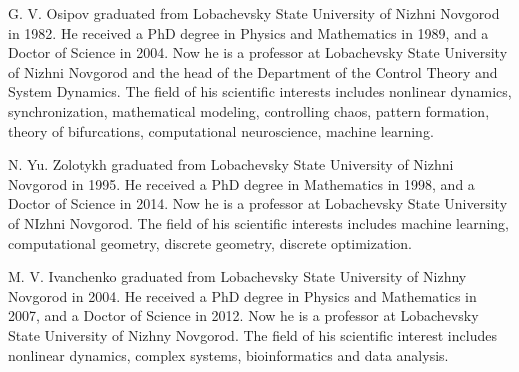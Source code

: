 \documentclass[submitted]{ieeeaccess}
\begin{document}
\begin{IEEEbiography}{G. V. Osipov} graduated from Lobachevsky State University of Nizhni Novgorod in 1982. He received a PhD degree in Physics and Mathematics in 1989, and a Doctor of Science in 2004. Now he is a professor at Lobachevsky State University of Nizhni Novgorod and the head of the Department of the Control Theory and System Dynamics. The field of his scientific interests includes nonlinear dynamics, synchronization, mathematical modeling,	controlling chaos, pattern formation, theory of bifurcations, computational neuroscience, machine learning.  
\end{IEEEbiography}


\begin{IEEEbiography}{N. Yu. Zolotykh} graduated from Lobachevsky State University of Nizhni Novgorod in 1995. He received a PhD degree in Mathematics in 1998, and a Doctor of Science in 2014. Now he is a professor at Lobachevsky State University of NIzhni Novgorod. The field of his scientific interests includes machine learning, computational geometry, discrete geometry, discrete optimization.  
\end{IEEEbiography}


\begin{IEEEbiography}{M. V. Ivanchenko} graduated from Lobachevsky State University of Nizhny Novgorod in 2004. He received a PhD degree in Physics and Mathematics in 2007, and a Doctor of Science in 2012. Now he is a professor at Lobachevsky State University of Nizhny Novgorod. The field of his scientific interest includes nonlinear dynamics, complex systems, bioinformatics and data analysis.  
\end{IEEEbiography}


\EOD
\end{document}
